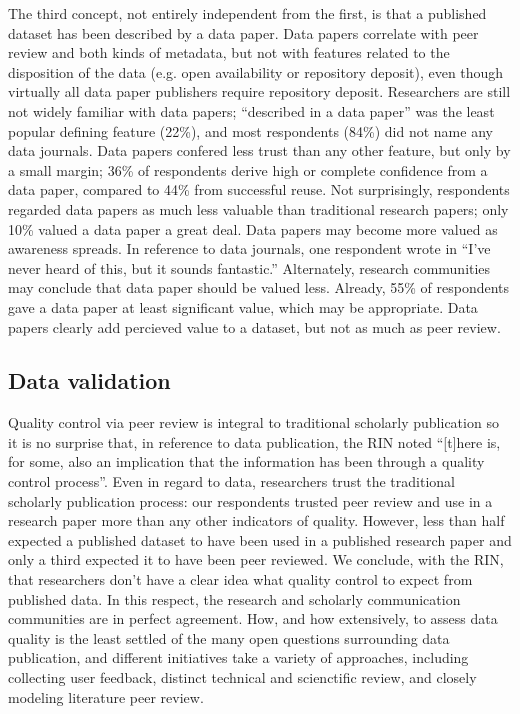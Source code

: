 \documentclass[10pt]{article}
\begin{document}
The third concept, not entirely independent from the first, is that a published dataset has been described by a data paper.
Data papers correlate with peer review and both kinds of metadata, but not with features related to the disposition of the data (e.g. open availability or repository deposit), even though virtually all data paper publishers require repository deposit.
Researchers are still not widely familiar with data papers; ``described in a data paper'' was the least popular defining feature (22\%), and most respondents (84\%) did not name any data journals.
Data papers confered less trust than any other feature, but only by a small margin; 36\% of respondents derive high or complete confidence from a data paper, compared to 44\% from successful reuse.
Not surprisingly, respondents regarded data papers as much less valuable than traditional research papers; only 10\% valued a data paper a great deal. %
Data papers may become more valued as awareness spreads.
In reference to data journals, one respondent wrote in ``I've never heard of this, but it sounds fantastic.''
Alternately, research communities may conclude that data paper should be valued less.
Already, 55\% of respondents gave a data paper at least significant value, which may be appropriate.
Data papers clearly add percieved value to a dataset, but not as much as peer review.
 
\subsection*{Data validation}

Quality control via peer review is integral to traditional scholarly publication so it is no surprise that, in reference to data publication, the RIN noted ``[t]here is, for some, also an implication that the information has been through a quality control process''\cite{swan_share_2008}.
Even in regard to data, researchers trust the traditional scholarly publication process: our respondents trusted peer review and use in a research paper more than any other indicators of quality.
However, less than half expected a published dataset to have been used in a published research paper and only a third expected it to have been peer reviewed.
We conclude, with the RIN, that researchers don't have a clear idea what quality control to expect from published data.
In this respect, the research and scholarly communication communities are in perfect agreement.
How, and how extensively, to assess data quality is the least settled of the many open questions surrounding data publication, and different initiatives take a variety of approaches, including collecting user feedback, distinct technical and scienctific review, and closely modeling literature peer review\cite{kratz_data_2014}.
\end{document}
